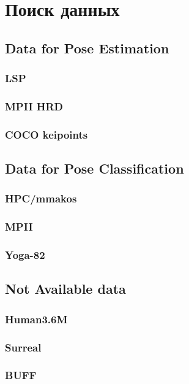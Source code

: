 \section{Поиск данных}
\label{sec:Chapter3} 

\subsection{Data for Pose Estimation}

\subsubsection{LSP}

\subsubsection{MPII HRD}

\subsubsection{COCO keipoints}

\subsection{Data for Pose Classification}

\subsubsection{HPC/mmakos}

\subsubsection{MPII}

\subsubsection{Yoga-82}

\subsection{Not Available data}

\subsubsection{Human3.6M}

\subsubsection{Surreal}

\subsubsection{BUFF}

\newpage
